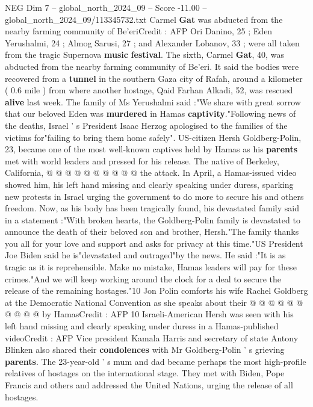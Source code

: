 \begin{textsample}{NEG Dim 7 – global\_north\_2024\_09 – Score -11.00 – global\_north\_2024\_09/113345732.txt}  \label{ex:f7_neg_014}
Carmel \textbf{Gat} was abducted from the nearby farming community of Be'eriCredit : AFP Ori Danino, 25 ; Eden Yerushalmi, 24 ; Almog Sarusi, 27 ; and Alexander Lobanov, 33 ; were all taken from the tragic Supernova \textbf{music} \textbf{festival}.
The sixth, Carmel \textbf{Gat}, 40, was abducted from the nearby farming community of Be'eri.
It said the bodies were recovered from a \textbf{tunnel} in the southern Gaza city of Rafah, around a kilometer ( 0.6 mile ) from where another hostage, Qaid Farhan Alkadi, 52, was rescued \textbf{alive} last week.
The family of Ms Yerushalmi said :"We share with great sorrow that our beloved Eden was \textbf{murdered} in Hamas \textbf{captivity}."Following news of the deaths, Israel ' s President Isaac Herzog apologised to the families of the victims for"failing to bring them home safely".
US-citizen Hersh Goldberg-Polin, 23, became one of the most well-known captives held by Hamas as his \textbf{parents} met with world leaders and pressed for his release.
The native of Berkeley, California, @ @ @ @ @ @ @ @ @ @ the attack.
In April, a Hamas-issued video showed him, his left hand missing and clearly speaking under duress, sparking new protests in Israel urging the government to do more to secure his and others freedom.
Now, as his body has been tragically found, his devastated family said in a statement :"With broken hearts, the Goldberg-Polin family is devastated to announce the death of their beloved son and brother, Hersh."The family thanks you all for your love and support and asks for privacy at this time."US President Joe Biden said he is"devastated and outraged"by the news.
He said :"It is as tragic as it is reprehensible.
Make no mistake, Hamas leaders will pay for these crimes."And we will keep working around the clock for a deal to secure the release of the remaining hostages."10 Jon Polin comforts his wife Rachel Goldberg at the Democratic National Convention as she speaks about their @ @ @ @ @ @ @ @ @ @ by HamasCredit : AFP 10 Israeli-American Hersh was seen with his left hand missing and clearly speaking under duress in a Hamas-published videoCredit : AFP Vice president Kamala Harris and secretary of state Antony Blinken also shared their \textbf{condolences} with Mr Goldberg-Polin ' s grieving \textbf{parents}.
The 23-year-old ' s mum and dad became perhaps the most high-profile relatives of hostages on the international stage.
They met with Biden, Pope Francis and others and addressed the United Nations, urging the release of all hostages.

\end{textsample}

